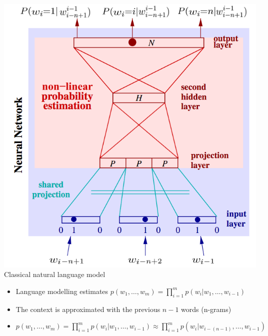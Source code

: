 \documentclass[11pt, a4paper, landscape]{article}
\begin{document}
\begin{minipage}[b]{.4\linewidth}
  \begin{center}
    \includegraphics[width=\linewidth]{../article/img/classic_nnlm}
    Classical natural language model
  \end{center}
\end{minipage}
\begin{minipage}[b]{.6\linewidth}
\vfill
\begin{itemize}
\item Language modelling estimates $p(w_1,\dots,w_m) = \prod_{i=1}^{m} p(w_i | w_1,\dots,w_{i-1})$
\item The context is approximated with the previous $n - 1$ words (n-grams)
\item $p(w_1,\dots,w_m) = \prod_{i=1}^{m} p(w_i | w_1,\dots,w_{i-1}) \approx \prod_{i=1}^{m} p(w_i | w_{i-(n-1)},\dots,w_{i-1})$
\end{itemize}
\vfill
\end{minipage}

\NewPage{}
\end{document}
